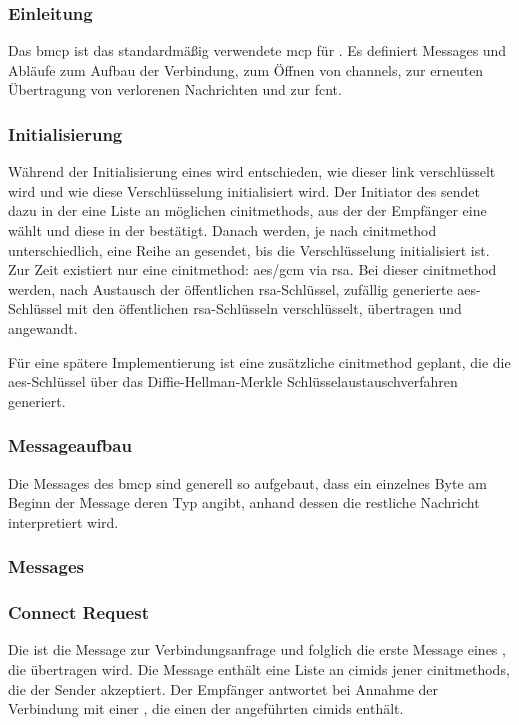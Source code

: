 \subsubsection{Einleitung}
Das \acrfull{bmcp} ist das standardmäßig verwendete \gls{mcp} für
.
Es definiert Messages und Abläufe zum Aufbau der Verbindung, zum Öffnen von
\glspl{channel}, zur erneuten Übertragung von verlorenen Nachrichten und zur
\gls{fcnt}.

\subsubsection{Initialisierung}
Während der Initialisierung eines  wird entschieden, wie
dieser \gls{link} verschlüsselt wird und wie diese Verschlüsselung initialisiert
wird.
Der Initiator des  sendet dazu in der \msg{\bmcpconnectreq}
eine Liste an möglichen \glspl{cinitmethod}, aus der der Empfänger eine wählt
und diese in der \msg{\bmcpconnectrep} bestätigt.
Danach werden, je nach \gls{cinitmethod} unterschiedlich, eine Reihe an
\msg{\bmcpcryptoinit} gesendet, bis die Verschlüsselung initialisiert ist.
Zur Zeit existiert nur eine \gls{cinitmethod}: \gls{aes}/\gls{gcm} via
\gls{rsa}.
Bei dieser \gls{cinitmethod} werden, nach Austausch der öffentlichen
\gls{rsa}-Schlüssel, zufällig generierte \gls{aes}-Schlüssel mit den
öffentlichen \gls{rsa}-Schlüsseln verschlüsselt, übertragen und angewandt.

Für eine spätere Implementierung ist eine zusätzliche \gls{cinitmethod} geplant,
die die \gls{aes}-Schlüssel über das Diffie-Hellman-Merkle
Schlüsselaustauschverfahren generiert.

\subsubsection{Messageaufbau}
Die Messages des \acrlong{bmcp} sind generell so aufgebaut, dass ein einzelnes
Byte am Beginn der Message deren Typ angibt, anhand dessen die restliche
Nachricht interpretiert wird.

\bmcpbytefield

\subsubsection{Messages}

\subsubsection*{Connect Request}
\label{dcl-bmcp-connectreq}
Die \msg{\bmcpconnectreq} ist die Message zur Verbindungsanfrage und folglich
die erste Message eines , die übertragen wird.
Die Message enthält eine Liste an \glspl{cimid} jener \glspl{cinitmethod}, die
der Sender akzeptiert.
Der Empfänger antwortet bei Annahme der Verbindung mit einer
\msg{\bmcpconnectrep}, die einen der angeführten \glspl{cimid} enthält.

